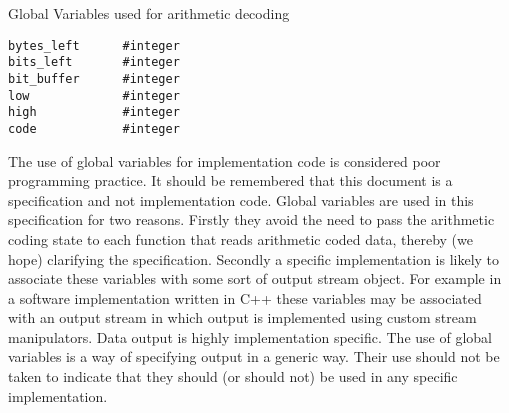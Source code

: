 
Global Variables used for arithmetic decoding
\begin{verbatim}
bytes_left      #integer
bits_left       #integer
bit_buffer      #integer
low             #integer
high            #integer
code            #integer
\end{verbatim}

\begin{informative}
The use of global variables for implementation code is
considered poor programming practice. It should be remembered that this
document is a specification and not implementation code. Global
variables are used in this specification for two reasons. Firstly they
avoid the need to pass the arithmetic coding state to each function that
reads arithmetic coded data, thereby (we hope) clarifying the specification.
Secondly a specific implementation is likely to associate these
variables with some sort of output stream object. For example in a
software implementation written in C++ these variables may be associated
with an output stream in which output is implemented using custom stream
manipulators. Data output is highly implementation specific. The use of
global variables is a way of specifying output in a generic way. Their
use should not be taken to indicate that they should (or should not) be
used in any specific implementation.
\end{informative}
